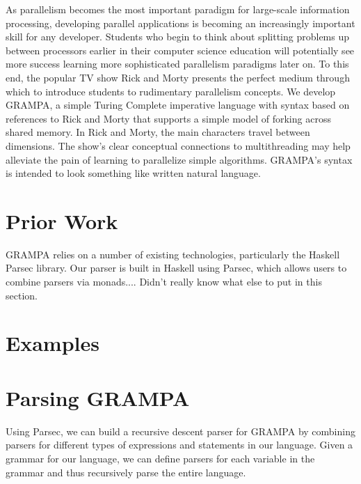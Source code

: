 \documentclass[preprint]{sigplanconf}
\begin{document}
As parallelism becomes the most important paradigm for large-scale information processing, developing parallel applications is becoming an increasingly important skill for any developer. Students who begin to think about splitting problems up between processors earlier in their computer science education will potentially see more success learning more sophisticated parallelism paradigms later on. To this end, the popular TV show Rick and Morty presents the perfect medium through which to introduce students to rudimentary parallelism concepts. We develop GRAMPA, a simple Turing Complete imperative language with syntax based on references to Rick and Morty that supports a simple model of forking across shared memory. In Rick and Morty, the main characters travel between dimensions. The show's clear conceptual connections to multithreading may help alleviate the pain of learning to parallelize simple algorithms. GRAMPA's syntax is intended to look something like written natural language.

\section{Prior Work}

GRAMPA relies on a number of existing technologies, particularly the Haskell Parsec library. Our parser is built in Haskell using Parsec, which allows users to combine parsers via monads.... Didn't really know what else to put in this section.

\section{Examples}

\section{Parsing GRAMPA}

Using Parsec, we can build a recursive descent parser for GRAMPA by combining parsers for different types of expressions and statements in our language. Given a grammar for our language, we can define parsers for each variable in the grammar and thus recursively parse the entire language.
\end{document}
